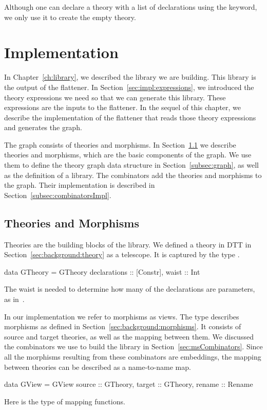 Although one can declare a theory with a list of declarations using the  keyword, we only use it to create the empty theory. 


\section{Implementation}
\label{subsec:theoriesMorphisms}
In Chapter~\ref{ch:library}, we described the library we are building. This library is the output of the flattener. In Section~\ref{sec:impl:expressions}, we introduced the theory expressions we need so that we can generate this library. These expressions are the inputs to the flattener. In the sequel of this chapter, we describe the implementation of the flattener that reads those theory expressions and generates the graph. 

The graph consists of theories and morphisms. In Section~\ref{sec:impl:Theories} we describe theories and morphisms, which are the basic components of the graph. We use them to define the theory graph data structure in Section~\ref{subsec:graph}, as well as the definition of a library. The combinators add the theories and morphisms to the graph. Their implementation is described in Section~\ref{subsec:combinatorsImpl}. 

\subsection{Theories and Morphisms}
\label{sec:impl:Theories}
Theories are the building blocks of the library. We defined a theory in DTT in Section~\ref{sec:background:theory} as a telescope.  It is captured by the type . 
\begin{hscode}
data GTheory = GTheory {
  declarations :: [Constr],
  waist        :: Int     }
\end{hscode}
The waist is needed to determine how many of the declarations are parameters, as in~\cite{alhassy2019}. 

In our implementation we refer to morphisms as views. The type  describes morphisms as defined in Section~\ref{sec:background:morphisms}. It consists of source and target theories, as well as the mapping between them. We discussed the combinators we use to build the library in Section~\ref{sec:msCombinators}. Since all the morphisms resulting from these combinators are embeddings, the mapping between theories can be described as a name-to-name map. 
\begin{hscode}
data GView  = GView {
  source  :: GTheory,
  target  :: GTheory,
  rename  :: Rename }  
\end{hscode}
\noindent Here  is the type of mapping functions. 

